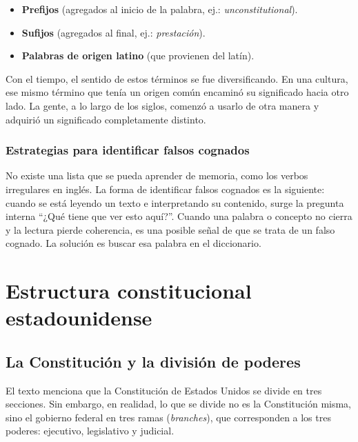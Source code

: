 \documentclass[12pt,oneside]{book}
\begin{document}
\begin{itemize}
    \item \textbf{Prefijos} (agregados al inicio de la palabra, ej.: \textit{unconstitutional}).
    \item \textbf{Sufijos} (agregados al final, ej.: \textit{prestación}).
    \item \textbf{Palabras de origen latino} (que provienen del latín).
\end{itemize}

Con el tiempo, el sentido de estos términos se fue diversificando. En una cultura, ese mismo término que tenía un origen común encaminó su significado hacia otro lado. La gente, a lo largo de los siglos, comenzó a usarlo de otra manera y adquirió un significado completamente distinto.

\subsection{Estrategias para identificar falsos cognados}

\begin{important}
No existe una lista que se pueda aprender de memoria, como los verbos irregulares en inglés. La forma de identificar falsos cognados es la siguiente: cuando se está leyendo un texto e interpretando su contenido, surge la pregunta interna ``¿Qué tiene que ver esto aquí?''. Cuando una palabra o concepto no cierra y la lectura pierde coherencia, es una posible señal de que se trata de un falso cognado. La solución es buscar esa palabra en el diccionario.
\end{important}

\chapter{Estructura constitucional estadounidense}

\section{La Constitución y la división de poderes}

El texto menciona que la Constitución de Estados Unidos se divide en tres secciones. Sin embargo, en realidad, lo que se divide no es la Constitución misma, sino el gobierno federal en tres ramas (\textit{branches}), que corresponden a los tres poderes: ejecutivo, legislativo y judicial.
\end{document}
